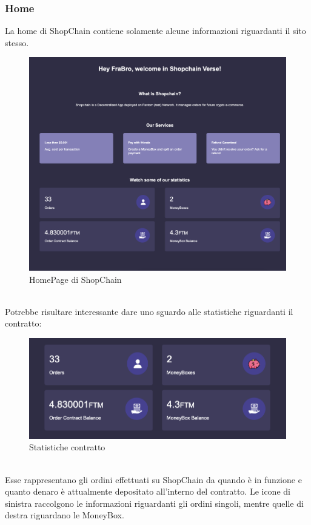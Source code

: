         \subsubsection{Home}
        La home di ShopChain contiene solamente alcune informazioni riguardanti il sito stesso.
        \begin{figure}[H]
            \centering
            \includegraphics[scale=0.3]{immagini/Home.png}
            \caption{HomePage di ShopChain}
        \end{figure}
        \textbf{}\\
        Potrebbe risultare interessante dare uno sguardo alle statistiche riguardanti il contratto:
        \begin{figure}[H]
            \centering
            \includegraphics[scale=0.4]{immagini/ContractDetails.png}
            \caption{Statistiche contratto}
        \end{figure}
        \textbf{}\\
        Esse rappresentano gli ordini effettuati su ShopChain da quando è in funzione e quanto denaro è attualmente depositato all'interno del contratto. Le icone di sinistra raccolgono le informazioni riguardanti gli ordini singoli, mentre quelle di destra riguardano le MoneyBox.
